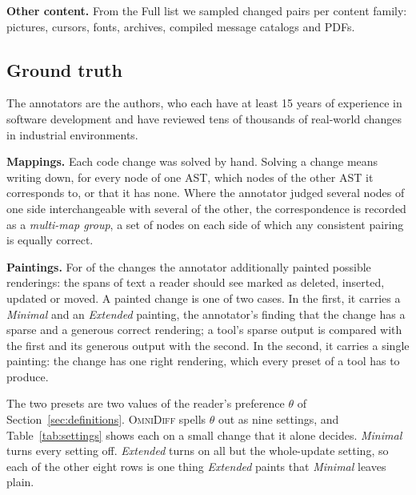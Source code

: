 \documentclass[sigconf,review]{acmart}
\begin{document}
\textbf{Other content.} From the Full list we sampled \ContentSamplePairs{} changed pairs per content
family: \ContentSamplePicturesPairs{} pictures, \ContentSampleCursorsPairs{} cursors,
\ContentSampleFontsPairs{} fonts, \ContentSampleArchivesPairs{} archives,
\ContentSampleCatalogsPairs{} compiled message catalogs and \ContentSamplePdfsPairs{} PDFs.

\subsection{Ground truth}
\label{sec:ground-truth}

The annotators are the authors, who each have at least 15 years of
experience in software development and have reviewed tens of thousands of real-world changes
in industrial environments.

\textbf{Mappings.} Each code change was solved by hand. Solving a change means writing down, for
every node of one AST, which nodes of the other AST it corresponds to, or that it has none. Where
the annotator judged several nodes of one side interchangeable with several of the other, the
correspondence is recorded as a \emph{multi-map group}, a set of nodes on each side of which any
consistent pairing is equally correct.

\textbf{Paintings.} For \PresetPainted{} of the changes the annotator additionally painted
possible renderings: the spans of text a reader should see marked as deleted, inserted, updated or
moved. A painted change is one of two cases. In the first, it carries a \emph{Minimal} and an
\emph{Extended} painting, the annotator's finding that the change has a sparse and a generous
correct rendering; a tool's sparse output is compared with the first and its generous output with
the second. In the second, it carries a single painting: the change has one right rendering, which
every preset of a tool has to produce.

The two presets are two values of the reader's preference $\theta$ of
Section~\ref{sec:definitions}. \textsc{OmniDiff} spells $\theta$ out as nine settings, and
Table~\ref{tab:settings} shows each on a small change that it alone decides. \emph{Minimal} turns
every setting off. \emph{Extended} turns on all but the whole-update setting, so each of the other
eight rows is one thing \emph{Extended} paints that \emph{Minimal} leaves plain.
\end{document}
